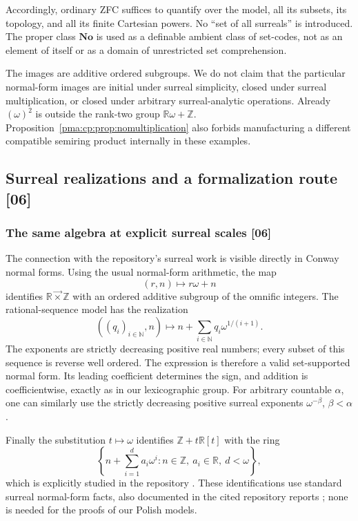 \documentclass[11pt]{article}
\numberwithin{equation}{section}
\theoremstyle{definition}
\theoremstyle{remark}
\newcommand{\N}{\mathbb N}
\newcommand{\Z}{\mathbb Z}
\newcommand{\R}{\mathbb R}
\newcommand{\No}{\mathbf{No}}
\newcommand{\lex}{\mathbin{\overrightarrow\times}}
\newcommand{\src}[1]{\textup{\textsf{\small[#1]}}}
\begin{document}
Accordingly, ordinary ZFC suffices to quantify over the model, all its
subsets, its topology, and all its finite Cartesian powers. No ``set of all
surreals'' is introduced. The proper class $\No$ is used as a definable
ambient class of set-codes, not as an element of itself or as a domain of
unrestricted set comprehension.

The images are additive ordered subgroups. We do not claim that the
particular normal-form images are initial under surreal simplicity,
closed under surreal multiplication, or closed under arbitrary
surreal-analytic operations. Already $(\omega)^2$ is outside the
rank-two group $\R\omega+\Z$. Proposition~\ref{pma:cp:prop:nomultiplication}
also forbids manufacturing a different compatible semiring product
internally in these examples.

\subsection{Surreal realizations and a formalization route \src{06}}
\label{pma:cp:sec:repo}

\subsubsection{The same algebra at explicit surreal scales \src{06}}

The connection with the repository's surreal work is visible directly
in Conway normal forms. Using the usual normal-form arithmetic, the
map
\begin{equation}
 (r,n)\longmapsto r\omega+n
 \label{pma:cp:eq:real-surreal}
\end{equation}
identifies $\R\lex\Z$ with an ordered additive subgroup of the
omnific integers. The rational-sequence model has the realization
\begin{equation}
 ((q_i)_{i\in\N},n)\longmapsto
       n+\sum_{i\in\N}q_i\omega^{1/(i+1)}.
 \label{pma:cp:eq:stream-surreal}
\end{equation}
The exponents are strictly decreasing positive real numbers; every
subset of this sequence is reverse well ordered. The expression is
therefore a valid set-supported normal form. Its leading coefficient
determines the sign, and addition is coefficientwise, exactly as in
our lexicographic group. For arbitrary countable $\alpha$, one can
similarly use the strictly decreasing positive surreal exponents
$\omega^{-\beta}$, $\beta<\alpha$.

Finally the substitution $t\mapsto\omega$ identifies
$\Z+t\R[t]$ with the ring
\[
 \left\{n+\sum_{i=1}^d a_i\omega^i:
               n\in\Z,\ a_i\in\R,\ d<\omega\right\},
\]
which is explicitly studied in the repository
\cite{s06:RepoPolynomial}. These identifications use standard surreal
normal-form facts, also documented in the cited repository reports
\cite{s06:RepoGroups,s06:RepoPolynomial}; none is needed for the proofs of our
Polish models.
\end{document}

